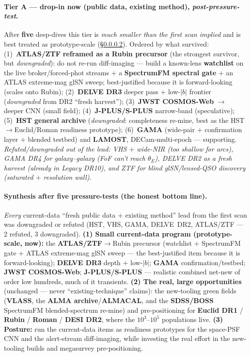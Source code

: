 \documentclass[11pt,letterpaper]{article}
\newcommand{\survey}[1]{\textbf{#1}}
\begin{document}
\paragraph{Tier A --- drop-in now (public data, existing method), \emph{post-pressure-test}.}
After \textbf{five} deep-dives this tier is \emph{much smaller than the first scan implied} and is
best treated as prototype-scale (\S\ref{sec:synth}). Ordered by what survived:
(1)~\survey{ATLAS/ZTF} \textbf{reframed as a Rubin precursor} (the strongest survivor, but
\emph{downgraded}): do not re-run diff-imaging --- build a known-lens \textbf{watchlist} on the live
broker/forced-phot streams $+$ a \textbf{SpectrumFM spectral gate} $+$ an ATLAS extreme-mag glSN
sweep; best-justified because it is forward-looking (scales onto Rubin); (2)~\survey{DELVE DR3}
deeper pass $+$ low-$|b|$ frontier (\emph{downgraded} from DR2 ``fresh harvest''); (3)~\survey{JWST
COSMOS-Web} $\to$ deeper CNN (small field); (4)~\survey{J-PLUS/S-PLUS} narrow-band (speculative);
(5)~\survey{HST general archive} (\emph{downgraded}: completeness re-mine, best as the
HST$\to$Euclid/Roman readiness prototype); (6)~\survey{GAMA} (wide-pair $+$ confirmation layer $+$
blended testbed) and \survey{LAMOST}, DECam-multi-epoch --- supporting.
\emph{Refuted/downgraded out of the lead: VHS $+$ wide-NIR (too shallow for arcs), GAMA DR4 for
galaxy--galaxy (FoF can't reach $\theta_E$), DELVE DR2 as a fresh harvest (already in Legacy DR10),
and ZTF for blind glSN/lensed-QSO discovery (saturated $+$ resolution wall).}

\paragraph{Synthesis after five pressure-tests (the honest bottom line).}\label{sec:synth}
\emph{Every} current-data ``fresh public data $+$ existing method'' lead from the first scan was
downgraded or refuted (HST, VHS, GAMA, DELVE~DR2, ATLAS/ZTF --- 2 refuted, 3 downgraded).
\textbf{(1) Small current-data program (prototype-scale, now):} the \survey{ATLAS/ZTF}$\to$Rubin
precursor (watchlist $+$ SpectrumFM gate $+$ ATLAS extreme-mag glSN sweep --- the best-justified item
because it is forward-looking); \survey{DELVE DR3} depth $+$ low-$|b|$; \survey{GAMA}
confirmation/testbed; \survey{JWST COSMOS-Web}; \survey{J-PLUS/S-PLUS} --- realistic combined net-new
of order low hundreds, much of it transients.
\textbf{(2) The real, large opportunities} (unchanged --- never ``existing-technique'' claims): the
new-tooling green fields (\survey{VLASS}, the \survey{ALMA archive}/\survey{ALMACAL}, and the
\survey{SDSS/BOSS} SpectrumFM blended-spectrum re-mine) and pre-positioning for \survey{Euclid DR1}
/ \survey{Rubin} / \survey{Roman} / \survey{DESI DR2}, where the $10^3$--$10^5$ populations live.
\textbf{(3) Posture:} run the current-data items as readiness prototypes for the space-PSF CNN and
the alert-stream diff-imaging, while investing the real effort in the new-tooling builds and
megasurvey pre-positioning.
\end{document}
